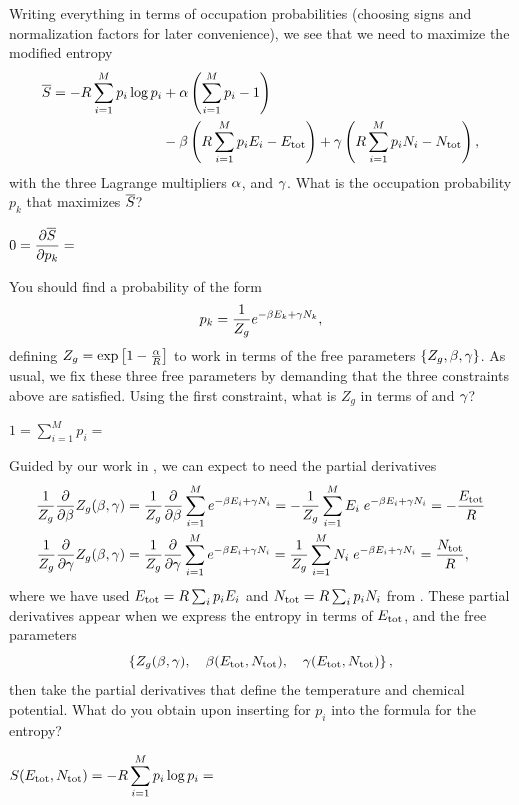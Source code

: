 Writing everything in terms of occupation probabilities (choosing signs and normalization factors for later convenience), we see that we need to maximize the modified entropy
\begin{align*}
  \overline S = -R \sum_{i = 1}^M p_i \log p_i & + \alpha\left(\sum_{i = 1}^M p_i - 1\right) \\
                                         & - \beta\left(R \sum_{i = 1}^M p_i E_i - E_{\text{tot}}\right) + \gamma\left(R \sum_{i = 1}^M p_i N_i - N_{\text{tot}}\right),
\end{align*}
with the three Lagrange multipliers $\alpha$, \be and $\gamma$.
What is the occupation probability $p_k$ that maximizes $\overline S$?
\begin{mdframed}
  $\displaystyle 0 = \frac{\partial \overline S}{\partial p_k} = $ \\[140 pt] %
\end{mdframed}

You should find a probability of the form
\begin{equation}
  \label{eq:grand_Lagrange}
  p_k = \frac{1}{Z_g} e^{-\beta E_k + \gamma N_k},
\end{equation}
defining $Z_g = \exp\left[1 - \frac{\alpha}{R}\right]$ to work in terms of the free parameters $\left\{Z_g, \beta, \gamma\right\}$.
As usual, we fix these three free parameters by demanding that the three constraints above are satisfied.
Using the first constraint, what is $Z_g$ in terms of \be and $\gamma$?
\begin{mdframed}
  $\displaystyle 1 = \sum_{i = 1}^M p_i = $ \\[50 pt]
\end{mdframed}

Guided by our work in , we can expect to need the partial derivatives
\begin{align}
  \frac{1}{Z_g} \frac{\partial }{\partial \beta} Z_g(\beta, \gamma) & = \frac{1}{Z_g} \frac{\partial }{\partial \beta} \sum_{i = 1}^M e^{-\beta E_i + \gamma N_i} = -\frac{1}{Z_g} \sum_{i = 1}^M E_i \; e^{-\beta E_i + \gamma N_i} = -\frac{E_{\text{tot}}}{R} \label{eq:grand_be_deriv} \\
  \frac{1}{Z_g} \frac{\partial }{\partial \gamma} Z_g(\beta, \gamma) & = \frac{1}{Z_g} \frac{\partial }{\partial \gamma} \sum_{i = 1}^M e^{-\beta E_i + \gamma N_i} = \frac{1}{Z_g} \sum_{i = 1}^M N_i \; e^{-\beta E_i + \gamma N_i} = \frac{N_{\text{tot}}}{R} \label{eq:grand_ga_deriv},
\end{align}
where we have used $E_{\text{tot}} = R \sum_i p_i E_i$ and $N_{\text{tot}} = R \sum_i p_i N_i$ from .
These partial derivatives appear when we express the entropy in terms of $E_{\text{tot}}$, \Ntot and the free parameters
\begin{equation*}
  \left\{Z_g(\beta, \gamma), \quad \beta(E_{\text{tot}}, N_{\text{tot}}), \quad \gamma(E_{\text{tot}}, N_{\text{tot}})\right\},
\end{equation*}
then take the partial derivatives that define the temperature and chemical potential.
What do you obtain upon inserting  for $p_i$ into the formula for the entropy?
\begin{mdframed}
  $\displaystyle S(E_{\text{tot}}, N_{\text{tot}}) = -R \sum_{i = 1}^M p_i \log p_i = $ \\[100 pt]
\end{mdframed}

